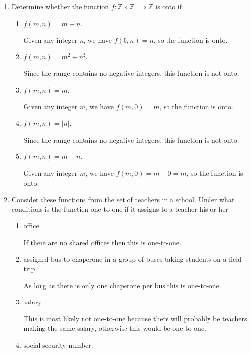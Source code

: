\documentclass[11pt]{article}
\begin{document}
\begin{enumerate}[label=\textbf{\arabic*.}]
	\item Determine whether the function $f: \mathbb{Z} \times \mathbb{Z} \implies \mathbb{Z}$ is onto if
	
	\begin{enumerate}[label=\textbf{\alph*)}]
		\item $f(m, n) = m + n$.
		
		Given any integer $n$, we have $f(0, n) = n$, so the function is onto.
		
		\item $f(m, n) = m^2 + n^2$.
		
		Since the range contains no negative integers, this function is not onto.
		
		\item $f(m, n) = m$.
		
		Given any integer $m$, we have $f(m, 0) = m$, so the function is onto.
		
		\item $f(m, n) = |n|$.
		
		Since the range contains no negative integers, this function is not onto.
		
		\item $f(m, n) = m - n$.
		
		Given any integer $m$, we have $f(m, 0) = m - 0 = m$, so the function is onto.
	\end{enumerate}

	\item Consider these functions from the set of teachers in a school. Under what conditions is the function one-to-one if it assigns to a teacher his or her
	
	\begin{enumerate}[label=\textbf{\alph*)}]
		\item office.
		
		If there are no shared offices then this is one-to-one.
		
		\item assigned bus to chaperone in a group of buses taking students on a field trip.
		
		As long as there is only one chaperone per bus this is one-to-one.
		
		\item salary.
		
		This is most likely not one-to-one because there will probably be teachers making the same salary, otherwise this would be one-to-one.
		
		\item social security number.
		

\end{enumerate}
\end{enumerate}
\end{document}

